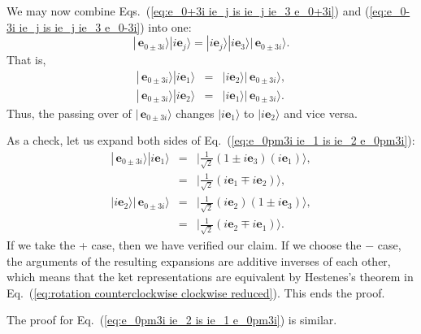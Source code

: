\documentclass[11pt,twocolumn]{article}
\begin{document}
We may now combine Eqs.~(\ref{eq:e_0+3i ie_j is ie_j ie_3 e_0+3i}) and (\ref{eq:e_0-3i ie_j is ie_j ie_3 e_0-3i}) into one:
\begin{equation}
\label{eq:e_0pm3i ie_j is ie_j ie_3 e_0pm3i}
|\,\mathbf e_{0\pm 3i}\rangle|i\mathbf e_j\rangle=|i\mathbf e_j\rangle|i\mathbf e_3\rangle|\,\mathbf e_{0\pm 3i}\rangle.
\end{equation}
That is,
\begin{eqnarray}
\label{eq:e_0pm3i ie_1 is ie_2 e_0pm3i}
|\,\mathbf e_{0\pm 3i}\rangle|i\mathbf e_1\rangle&=&|i\mathbf e_2\rangle|\,\mathbf e_{0\pm 3i}\rangle,\\
\label{eq:e_0pm3i ie_2 is ie_1 e_0pm3i}
|\,\mathbf e_{0\pm 3i}\rangle|i\mathbf e_2\rangle&=&|i\mathbf e_1\rangle|\,\mathbf e_{0\pm 3i}\rangle.
\end{eqnarray}
Thus, the passing over of $|\,\mathbf e_{0\pm 3i}\rangle$ changes $|i\mathbf e_1\rangle$ to $|i\mathbf e_2\rangle$ and vice versa.

As a check, let us expand both sides of Eq.~(\ref{eq:e_0pm3i ie_1 is ie_2 e_0pm3i}):
\begin{eqnarray}
\label{eq:e_0pm3i ie_1 is ie_1 mp ie_2}
|\,\mathbf e_{0\pm 3i}\rangle|i\mathbf e_1\rangle&=&|\frac{1}{\sqrt{2}}(1\pm i\mathbf e_3)(i\mathbf e_1)\rangle,\nonumber\\
&=&|\frac{1}{\sqrt{2}}(i\mathbf e_1\mp i\mathbf e_2)\rangle,\\
|i\mathbf e_2\rangle|\,\mathbf e_{0\pm 3i}\rangle&=&|\frac{1}{\sqrt{2}}(i\mathbf e_2)(1\pm i\mathbf e_3)\rangle,\nonumber\\
&=&|\frac{1}{\sqrt{2}}(i\mathbf e_2\mp i\mathbf e_1)\rangle.
\end{eqnarray}
If we take the + case, then we have verified our claim.  If we choose the $-$ case, the arguments of the resulting expansions are additive inverses of each other, which means that the ket representations are equivalent by Hestenes's theorem in Eq.~(\ref{eq:rotation counterclockwise clockwise reduced}).  This ends the proof.

The proof for Eq.~(\ref{eq:e_0pm3i ie_2 is ie_1 e_0pm3i}) is similar.
\end{document}
